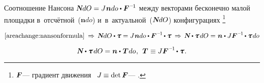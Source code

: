\begin{otherlanguage}{russian}

Соотношение Нансона ${\mathboldN dO = J \hspace{.1ex} \bm{n} do \dotp \bm{F}^{\hspace{.1ex}\expminusone} \hspace{-0.1ex}}$ между векторами бесконечно малой площадки в~отсчётной~(${\bm{n} do}$) и~в~актуальной~(${\mathboldN dO}$) конфигурациях%
\footnote{ ${\bm{F}\hspace{-0.12ex}}$\:--- градиент движения ~${J \hspace{-0.1ex} \equiv \operatorname{det} \bm{F}\hspace{-0.12ex}}$\:--- .}

\nopagebreak\vspace{-0.12em}\begin{equation*}
\eqref{areachange:nansonformula}
\:\Rightarrow\,
\mathboldN dO \dotp \cauchystress
= J \hspace{.1ex} \bm{n} do \dotp \bm{F}^{\hspace{.1ex}\expminusone} \hspace{-0.2ex} \dotp \cauchystress
\:\Rightarrow\,
\mathboldN \dotp \cauchystress \hspace{.25ex} dO
= \hspace{.1ex} \bm{n} \dotp J \bm{F}^{\hspace{.1ex}\expminusone} \hspace{-0.2ex} \dotp \cauchystress \hspace{.2ex} do
\end{equation*}

\vspace{-0.2em} \noindent {}

\nopagebreak\vspace{-0.16em}\begin{equation}\label{dualexpressionofsurfaceforce}
\mathboldN \dotp \cauchystress \hspace{.25ex} dO
= \bm{n} \dotp \hspace{.12ex} \firstpiolakirchhoffstress \hspace{.1ex} do
\hspace{.1ex}, \:\:
\firstpiolakirchhoffstress \hspace{.1ex} \equiv J \bm{F}^{\hspace{.1ex}\expminusone} \hspace{-0.2ex} \dotp \cauchystress \hspace{.1ex}.
\end{equation}


\end{otherlanguage}

